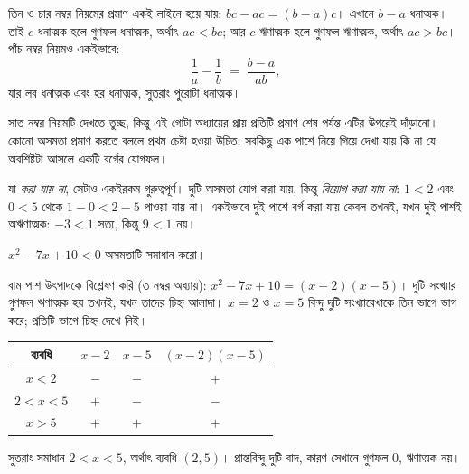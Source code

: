 \documentclass[11pt]{article}
\begin{document}
তিন ও চার নম্বর নিয়মের প্রমাণ একই লাইনে হয়ে যায়: $bc - ac = (b-a)c$। এখানে
$b - a$ ধনাত্মক। তাই $c$ ধনাত্মক হলে গুণফল ধনাত্মক, অর্থাৎ $ac < bc$; আর $c$
ঋণাত্মক হলে গুণফল ঋণাত্মক, অর্থাৎ $ac > bc$। পাঁচ নম্বর নিয়মও একইভাবে:
\[
  \frac{1}{a} - \frac{1}{b} \;=\; \frac{b-a}{ab},
\]
যার লব ধনাত্মক এবং হর ধনাত্মক, সুতরাং পুরোটা ধনাত্মক।

সাত নম্বর নিয়মটি দেখতে তুচ্ছ, কিন্তু এই গোটা অধ্যায়ের প্রায় প্রতিটি প্রমাণ
শেষ পর্যন্ত এটির উপরেই দাঁড়ানো। কোনো অসমতা প্রমাণ করতে বললে প্রথম চেষ্টা হওয়া
উচিত: সবকিছু এক পাশে নিয়ে গিয়ে দেখা যায় কি না যে অবশিষ্টটা আসলে একটি বর্গের
যোগফল।

\begin{remark}
যা \emph{করা যায় না}, সেটাও একইরকম গুরুত্বপূর্ণ। দুটি অসমতা যোগ করা যায়, কিন্তু
\emph{বিয়োগ করা যায় না}: $1 < 2$ এবং $0 < 5$ থেকে $1 - 0 < 2 - 5$ পাওয়া যায়
না। একইভাবে দুই পাশে বর্গ করা যায় কেবল তখনই, যখন দুই পাশই অঋণাত্মক: $-3 < 1$
সত্য, কিন্তু $9 < 1$ নয়।
\end{remark}

\begin{example}
$x^2 - 7x + 10 < 0$ অসমতাটি সমাধান করো।
\end{example}

\begin{solbox}
বাম পাশ উৎপাদকে বিশ্লেষণ করি (৩ নম্বর অধ্যায়): $x^2 - 7x + 10 = (x-2)(x-5)$।
দুটি সংখ্যার গুণফল ঋণাত্মক হয় তখনই, যখন তাদের চিহ্ন আলাদা। $x = 2$ ও $x = 5$
বিন্দু দুটি সংখ্যারেখাকে তিন ভাগে ভাগ করে; প্রতিটি ভাগে চিহ্ন দেখে নিই।

\begin{center}
\begin{tabular}{c|c|c|c}
 ব্যবধি & $x-2$ & $x-5$ & $(x-2)(x-5)$ \\ \hline
 $x < 2$     & $-$ & $-$ & $+$ \\
 $2 < x < 5$ & $+$ & $-$ & $-$ \\
 $x > 5$     & $+$ & $+$ & $+$ \\
\end{tabular}
\end{center}

সুতরাং সমাধান $2 < x < 5$, অর্থাৎ ব্যবধি $(2,5)$। প্রান্তবিন্দু দুটি বাদ, কারণ
সেখানে গুণফল $0$, ঋণাত্মক নয়।

\begin{center}
\end{center}
\end{solbox}
\end{document}
